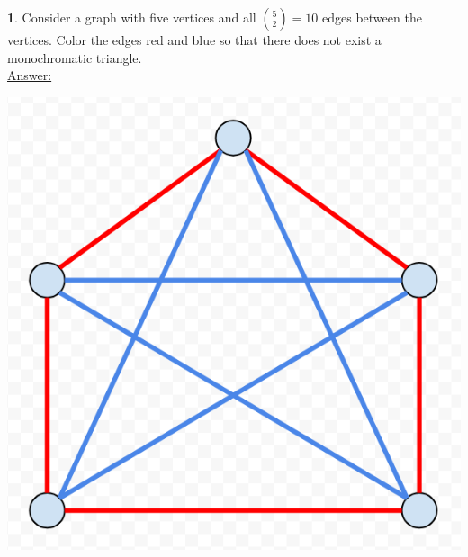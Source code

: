 \documentclass[12pt,a4paper]{article}
\theoremstyle{definition}
\newtheorem{problem}{}
\begin{document}
\begin{problem}
Consider a graph with five vertices and all $\binom{5}{2} = 10$ edges between the vertices. Color the edges red and blue so that there does not exist a monochromatic triangle. \\

\underline{Answer:} \\
\centerline{\includegraphics[scale=0.4]{q4.png}} \\\\\\\\\\\\\\\\\\\\

\end{problem}
\end{document}
